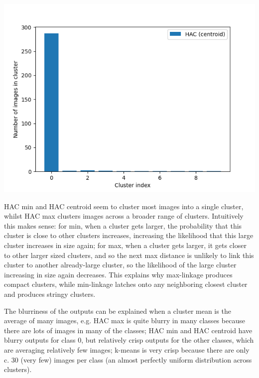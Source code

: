 \documentclass[submit]{harvardml}
\begin{document}
\begin{center}
    \includegraphics[scale=0.6]{HW4/2.5_haccentroid.png}
\end{center}
HAC min and HAC centroid seem to cluster most images into a single cluster, whilst HAC max clusters images across a broader range of clusters. Intuitively this makes sense: for min, when a cluster gets larger, the probability that this cluster is close to other clusters increases, increasing the likelihood that this large cluster increases in size again; for max, when a cluster gets larger, it gets closer to other larger sized clusters, and so the next max distance is unlikely to link this cluster to another already-large cluster, so the likelihood of the large cluster increasing in size again decreases. This explains why max-linkage produces compact clusters, while min-linkage latches onto any neighboring closest cluster and produces stringy clusters.

The blurriness of the outputs can be explained when a cluster mean is the average of many images, e.g. HAC max is quite blurry in many classes because there are lots of images in many of the classes; HAC min and HAC centroid have blurry outputs for class 0, but relatively crisp outputs for the other classes, which are averaging relatively few images; k-means is very crisp because there are only c. 30 (very few) images per class (an almost perfectly uniform distribution across clusters).
\newpage
\end{document}
